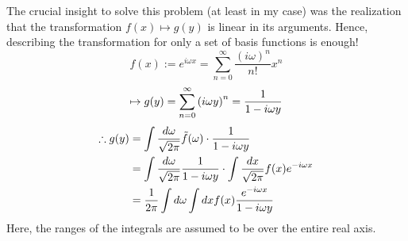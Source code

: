 \item

The crucial insight to solve this problem (at least in my case) was the realization that
the transformation $f(x) \mapsto g(y)$ is linear in its arguments.
Hence, describing the transformation for only a set of basis functions is enough!
\[
    f(x) := e^{i\omega x} = \sum_{n=0}^\infty \frac{{(i\omega)}^n}{n!} x^n
\]
\[
    \mapsto g(y) = \sum_{n=0}^\infty {(i\omega y)}^n = \frac{1}{1 - i\omega y}
\]
\begin{align*}
    \therefore g(y)
    &= \int \frac{d\omega}{\sqrt{2\pi}} \Tilde{f}(\omega) \cdot \frac{1}{1 - i\omega y} \\
    &= \int \frac{d\omega}{\sqrt{2\pi}} \frac{1}{1 - i\omega y}
     \cdot \int \frac{dx}{\sqrt{2\pi}} f(x) e^{-i\omega x} \\
    &= \frac{1}{2\pi} \int d\omega \int dx f(x) \frac{e^{-i\omega x}}{1 - i\omega y}
\end{align*}
Here, the ranges of the integrals are assumed to be over the entire real axis.